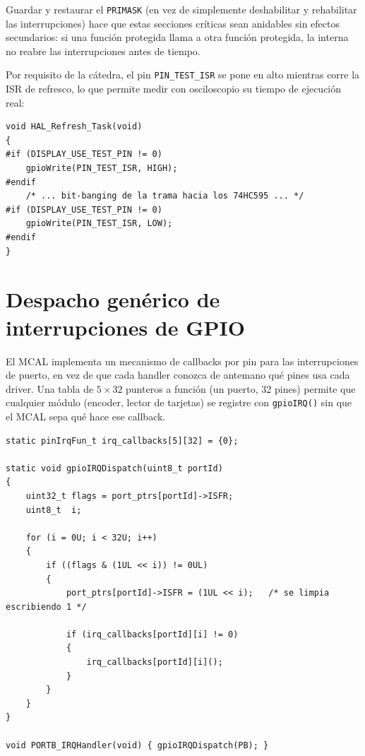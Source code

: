 \documentclass[11pt,a4paper]{article}
\begin{document}
Guardar y restaurar el \lstinline{PRIMASK} (en vez de simplemente
deshabilitar y rehabilitar las interrupciones) hace que estas secciones
críticas sean anidables sin efectos secundarios: si una función protegida
llama a otra función protegida, la interna no reabre las interrupciones
antes de tiempo.

Por requisito de la cátedra, el pin \lstinline{PIN_TEST_ISR} se pone en
alto mientras corre la ISR de refresco, lo que permite medir con
osciloscopio su tiempo de ejecución real:

\begin{lstlisting}[caption={Instrumentación para medir la duración de la ISR con osciloscopio.}, label={lst:testpin}]
void HAL_Refresh_Task(void)
{
#if (DISPLAY_USE_TEST_PIN != 0)
    gpioWrite(PIN_TEST_ISR, HIGH);
#endif
    /* ... bit-banging de la trama hacia los 74HC595 ... */
#if (DISPLAY_USE_TEST_PIN != 0)
    gpioWrite(PIN_TEST_ISR, LOW);
#endif
}
\end{lstlisting}


\section{Despacho genérico de interrupciones de GPIO}

El MCAL implementa un mecanismo de callbacks por pin para las interrupciones
de puerto, en vez de que cada handler conozca de antemano qué pines usa
cada driver. Una tabla de $5 \times 32$ punteros a función (un puerto, 32
pines) permite que cualquier módulo (encoder, lector de tarjetas) se
registre con \lstinline{gpioIRQ()} sin que el MCAL sepa qué hace ese
callback.

\begin{lstlisting}[caption={Tabla de callbacks y despacho genérico de IRQ de puerto (\texttt{gpio.c}).}, label={lst:gpioirq}]
static pinIrqFun_t irq_callbacks[5][32] = {0};

static void gpioIRQDispatch(uint8_t portId)
{
    uint32_t flags = port_ptrs[portId]->ISFR;
    uint8_t  i;

    for (i = 0U; i < 32U; i++)
    {
        if ((flags & (1UL << i)) != 0UL)
        {
            port_ptrs[portId]->ISFR = (1UL << i);   /* se limpia escribiendo 1 */

            if (irq_callbacks[portId][i] != 0)
            {
                irq_callbacks[portId][i]();
            }
        }
    }
}

void PORTB_IRQHandler(void) { gpioIRQDispatch(PB); }
\end{lstlisting}
\end{document}

